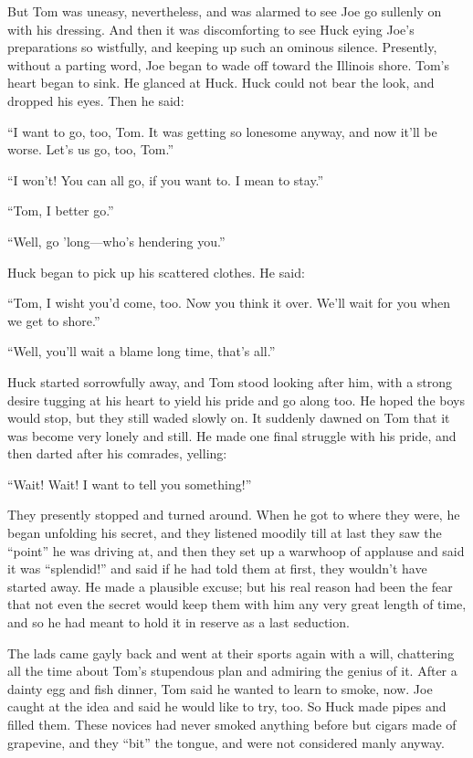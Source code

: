 \documentclass{book}
\begin{document}
But Tom was uneasy, nevertheless, and was alarmed to see Joe go sullenly on with his dressing. And then it was discomforting to see Huck eying Joe’s preparations so wistfully, and keeping up such an ominous silence. Presently, without a parting word, Joe began to wade off toward the Illinois shore. Tom’s heart began to sink. He glanced at Huck. Huck could not bear the look, and dropped his eyes. Then he said:

“I want to go, too, Tom. It was getting so lonesome anyway, and now it’ll be worse. Let’s us go, too, Tom.”

“I won’t! You can all go, if you want to. I mean to stay.”

“Tom, I better go.”

“Well, go ’long—who’s hendering you.”

Huck began to pick up his scattered clothes. He said:

“Tom, I wisht you’d come, too. Now you think it over. We’ll wait for you when we get to shore.”

“Well, you’ll wait a blame long time, that’s all.”

Huck started sorrowfully away, and Tom stood looking after him, with a strong desire tugging at his heart to yield his pride and go along too. He hoped the boys would stop, but they still waded slowly on. It suddenly dawned on Tom that it was become very lonely and still. He made one final struggle with his pride, and then darted after his comrades, yelling:

“Wait! Wait! I want to tell you something!”

They presently stopped and turned around. When he got to where they were, he began unfolding his secret, and they listened moodily till at last they saw the “point” he was driving at, and then they set up a warwhoop of applause and said it was “splendid!” and said if he had told them at first, they wouldn’t have started away. He made a plausible excuse; but his real reason had been the fear that not even the secret would keep them with him any very great length of time, and so he had meant to hold it in reserve as a last seduction.

The lads came gayly back and went at their sports again with a will, chattering all the time about Tom’s stupendous plan and admiring the genius of it. After a dainty egg and fish dinner, Tom said he wanted to learn to smoke, now. Joe caught at the idea and said he would like to try, too. So Huck made pipes and filled them. These novices had never smoked anything before but cigars made of grapevine, and they “bit” the tongue, and were not considered manly anyway.
\end{document}

